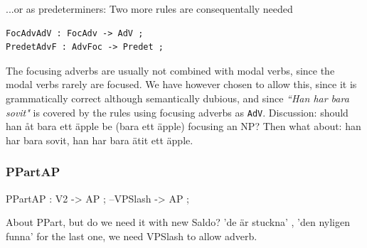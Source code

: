 \documentclass{report}
\begin{document}
...or as predeterminers:
Two more rules are consequentally needed
\begin{verbatim}
FocAdvAdV : FocAdv -> AdV ;
PredetAdvF : AdvFoc -> Predet ;
\end{verbatim}



The focusing adverbs are usually not combined with modal verbs, since the modal
verbs rarely are focused.
We have however chosen to allow this, since it is grammatically correct although semantically
dubious, and since \emph{``Han har bara sovit"} is covered by the rules using focusing
adverbs as \verb-AdV-.
Discussion: should han åt bara ett äpple be (bara ett äpple) focusing an NP?
Then what about: han har bara sovit, han har bara ätit ett äpple.\\

\subsubsection{PPartAP}

PPartAP : V2 -> AP ; --VPSlash -> AP ;

About PPart, but do we need it with new Saldo? 'de är stuckna' , 'den nyligen
funna'
for the last one, we need VPSlash to allow adverb.
\end{document}

